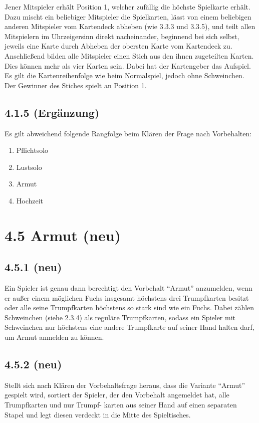 Jener Mitspieler erhält Position 1, welcher zufällig die höchste
Spielkarte erhält. Dazu mischt ein beliebiger Mitspieler die
Spielkarten, lässt von einem beliebigen anderen Mitspieler vom
Kartendeck abheben (wie 3.3.3 und 3.3.5), und teilt allen Mitspielern im
Uhrzeigersinn direkt nacheinander, beginnend bei sich selbst, jeweils
eine Karte durch Abheben der obersten Karte vom Kartendeck zu.
Anschließend bilden alle Mitspieler einen Stich aus den ihnen
zugeteilten Karten. Dies können mehr als vier Karten sein. Dabei hat
der Kartengeber das Aufspiel. Es gilt die Kartenreihenfolge wie beim
Normalspiel, jedoch ohne Schweinchen. Der Gewinner des Stiches spielt an
Position 1.

\subsection*{4.1.5 (Ergänzung)}

Es gilt abweichend folgende Rangfolge beim Klären der Frage nach
Vorbehalten:

\begin{enumerate}
	\item Pflichtsolo
	\item Lustsolo
	\item Armut
	\item Hochzeit
\end{enumerate}

\section*{4.5 Armut (neu)}

\subsection*{4.5.1 (neu)}
 Ein Spieler ist genau dann berechtigt den Vorbehalt ``Armut''
anzumelden, wenn er außer einem möglichen Fuchs insgesamt höchstens
drei Trumpfkarten besitzt oder alle seine Trumpfkarten höchstens so
stark sind wie ein Fuchs. Dabei zählen Schweinchen (siehe 2.3.4) als
reguläre Trumpfkarten, sodass ein Spieler mit Schweinchen nur
höchstens eine andere Trumpfkarte auf seiner Hand halten darf, um Armut
anmelden zu können.

\subsection*{4.5.2 (neu)}

Stellt sich nach Klären der Vorbehaltsfrage heraus, dass die Variante
``Armut'' gespielt wird, sortiert der Spieler, der den Vorbehalt
angemeldet hat, alle Trumpfkarten und nur Trumpf- karten aus seiner Hand
auf einen separaten Stapel und legt diesen verdeckt in die Mitte des
Spieltisches.

